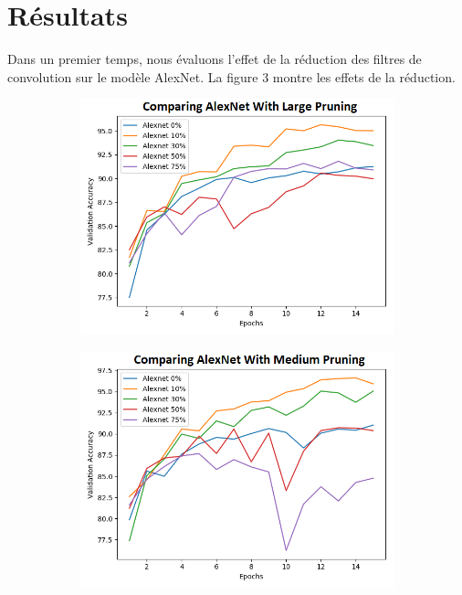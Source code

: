 \documentclass[12pt]{article}
\begin{document}
\section*{Résultats}
Dans un premier temps, nous évaluons l’effet de la réduction des filtres de convolution sur le modèle AlexNet. La figure 3 montre les effets de la réduction.
\begin{figure}[H]
	\centering
	\begin{subfigure}[b]{0.33\textwidth}            
		\includegraphics[width=\textwidth]{prune_ratio_rough}
		\label{fig:pruneratiorough}
	\end{subfigure}%
	\begin{subfigure}[b]{0.33\textwidth}
		\centering
		\includegraphics[width=\textwidth]{prune_ratio_medium}

\end{subfigure}
\end{figure}
\end{document}
